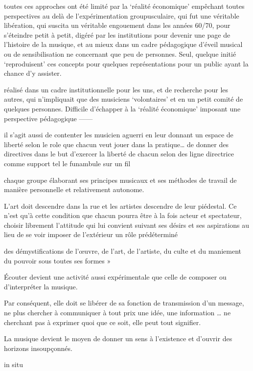 toutes ces approches ont été limité par la `réalité économique’ empêchant toutes perspectives au delà de l’expérimentation groupusculaire, qui fut une véritable libération, qui suscita un véritable engouement dans les années 60/70, pour s’éteindre petit à petit, digéré par les institutions pour devenir une page de l’histoire de la musique, et au mieux dans un cadre pédagogique d’éveil musical ou de sensibilisation ne concernant que peu de personnes. Seul, quelque initié `reproduisent’ ces concepts pour quelques représentations pour un public ayant la chance d’y assister. 

réalisé dans un cadre institutionnelle pour les uns, et de recherche pour les autres, qui n’impliquait que des musiciens `volontaires’ et en un petit comité de quelques personnes. Difficile d’échapper à la `réalité économique’ imposant une perspective pédagogique
——

il s’agit aussi de contenter les musicien aguerri  en leur donnant un espace de liberté selon le role que chacun veut jouer dans la pratique…
de donner des directives dans le but d’exercer la liberté de chacun selon des ligne directrice comme support tel le funambule sur un fil 

chaque groupe élaborant ses principes musicaux et ses méthodes de travail de manière personnelle et relativement autonome.

L'art doit descendre dans la rue et les artistes descendre de leur piédestal. Ce n’est qu’à cette condition que chacun pourra être à la fois acteur et spectateur, choisir librement l’attitude qui lui convient suivant ses désirs et ses aspirations au lieu de se voir imposer de l’extérieur un rôle prédéterminé

des démystifications de l’œuvre, de l’art, de l’artiste, du culte et du maniement du pouvoir sous toutes ses formes »

Écouter devient une activité aussi expérimentale que celle de composer ou d'interpréter la musique. 

Par conséquent, elle doit se libérer de sa fonction de transmission d’un message, ne plus chercher à communiquer à tout prix une idée, une information
…
ne cherchant pas à exprimer quoi que ce soit, elle peut tout signifier.

La musique devient le moyen de donner un sens à l’existence et d'ouvrir des horizons insoupçonnés.





in situ

